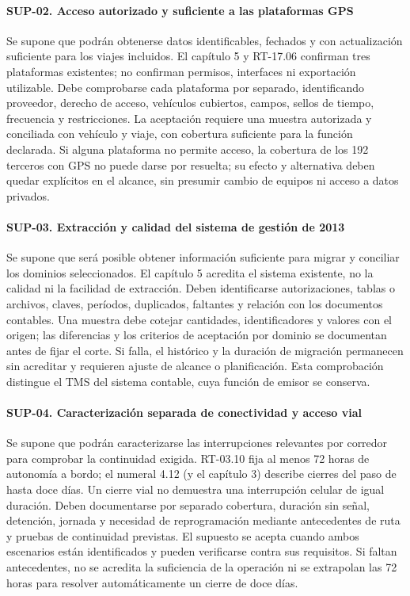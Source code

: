 \paragraph{SUP-02. Acceso autorizado y suficiente a las plataformas GPS}
Se supone que podrán obtenerse datos identificables, fechados y con actualización suficiente para los viajes incluidos. El capítulo 5 y RT-17.06 confirman tres plataformas existentes; no confirman permisos, interfaces ni exportación utilizable. Debe comprobarse cada plataforma por separado, identificando proveedor, derecho de acceso, vehículos cubiertos, campos, sellos de tiempo, frecuencia y restricciones. La aceptación requiere una muestra autorizada y conciliada con vehículo y viaje, con cobertura suficiente para la función declarada. Si alguna plataforma no permite acceso, la cobertura de los 192 terceros con GPS no puede darse por resuelta; su efecto y alternativa deben quedar explícitos en el alcance, sin presumir cambio de equipos ni acceso a datos privados.

\paragraph{SUP-03. Extracción y calidad del sistema de gestión de 2013}
Se supone que será posible obtener información suficiente para migrar y conciliar los dominios seleccionados. El capítulo 5 acredita el sistema existente, no la calidad ni la facilidad de extracción. Deben identificarse autorizaciones, tablas o archivos, claves, períodos, duplicados, faltantes y relación con los documentos contables. Una muestra debe cotejar cantidades, identificadores y valores con el origen; las diferencias y los criterios de aceptación por dominio se documentan antes de fijar el corte. Si falla, el histórico y la duración de migración permanecen sin acreditar y requieren ajuste de alcance o planificación. Esta comprobación distingue el TMS del sistema contable, cuya función de emisor se conserva.

\paragraph{SUP-04. Caracterización separada de conectividad y acceso vial}
Se supone que podrán caracterizarse las interrupciones relevantes por corredor para comprobar la continuidad exigida. RT-03.10 fija al menos 72 horas de autonomía a bordo; el numeral 4.12 (y el capítulo 3) describe cierres del paso de hasta doce días. Un cierre vial no demuestra una interrupción celular de igual duración. Deben documentarse por separado cobertura, duración sin señal, detención, jornada y necesidad de reprogramación mediante antecedentes de ruta y pruebas de continuidad previstas. El supuesto se acepta cuando ambos escenarios están identificados y pueden verificarse contra sus requisitos. Si faltan antecedentes, no se acredita la suficiencia de la operación ni se extrapolan las 72 horas para resolver automáticamente un cierre de doce días.

